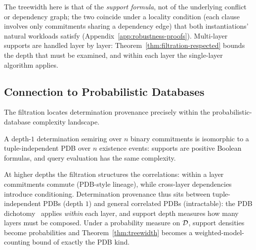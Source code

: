 \noindent
The treewidth here is that of the \emph{support formula}, not of the
underlying conflict or dependency graph; the two coincide under a locality
condition (each clause involves only commitments sharing a dependency edge)
that both instantiations' natural workloads satisfy
(Appendix~\ref{app:robustness-proofs}). Multi-layer supports are handled layer
by layer: Theorem~\ref{thm:filtration-respected} bounds the depth that must be
examined, and within each layer the single-layer algorithm applies.

\subsection{Connection to Probabilistic Databases}
\label{sec:pdb}

The filtration locates determination provenance precisely within the
probabilistic-database complexity landscape.

\begin{proposition}
  \label{prop:pdb}
  A depth-$1$ determination semiring over $n$ binary commitments is isomorphic
  to a tuple-independent PDB over $n$ existence events: supports are positive
  Boolean formulas, and query evaluation has the same complexity.
\end{proposition}

\noindent
At higher depths the filtration structures the correlations: within a layer
commitments commute (PDB-style lineage), while cross-layer dependencies
introduce conditioning. Determination provenance thus sits between
tuple-independent PDBs (depth $1$) and general correlated PDBs (intractable):
the PDB dichotomy~\cite{dalvi2012probabilistic} applies \emph{within} each
layer, and support depth measures how many layers must be composed. Under a
probability measure on $\mathcal{D}$, support densities become probabilities and
Theorem~\ref{thm:treewidth} becomes a weighted-model-counting bound of exactly
the PDB kind.
